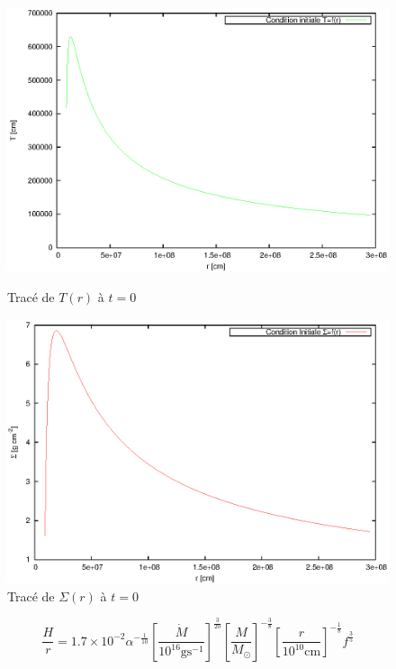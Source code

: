 \documentclass[french]{beamer}
\begin{document}
\begin{frame}
 \begin{figure}[ht]
   \begin{minipage}[c]{.46\linewidth}
      \includegraphics[scale=0.42]{ic_T.eps}
      \caption{Tracé de $T(r)$ à $t = 0$}
   \end{minipage} \hfill
   \begin{minipage}[c]{.46\linewidth}
      \includegraphics[scale=0.42]{ic_Sig.eps}
      \caption{Tracé de $\Sigma(r)$ à $t = 0$}
   \end{minipage}
\end{figure} 
\end{frame}

\begin{frame}
	\begin{equation}
	\frac{H}{r} = 1.7 \times 10^{-2}\alpha^{- \frac{1}{10}} \left[ \frac{\dot{M}}{10^{16} \mbox{g} \mbox{s}^{-1}} \right]^{\frac{3}{20}} \left[ \frac{M}{M_\odot}\right]^{- \frac{3}{8}} \left[ \frac{r}{10^{10} \mathrm{cm}}\right]^{- \frac{1}{8}} f^{\frac{3}{5}}
\end{equation}
\end{frame}
\end{document}
